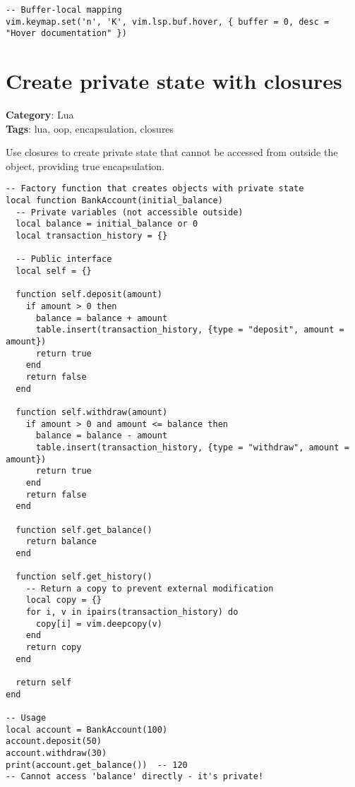 {{{{{{\begin{Exa*}{}
\begin{Verbatim}[fontsize=\footnotesize, breaklines, breakanywhere]
-- Buffer-local mapping
vim.keymap.set('n', 'K', vim.lsp.buf.hover, { buffer = 0, desc = "Hover documentation" })
\end{Verbatim}
\end{Exa*}

\section{Create private state with closures}

\textbf{Category}: Lua\\ \textbf{Tags}: lua, oop, encapsulation, closures
\vspace{0.5cm}

Use closures to create private state that cannot be accessed from outside the object, providing true encapsulation.

\begin{Exa*}{}
\begin{Verbatim}[fontsize=\footnotesize, breaklines, breakanywhere]
-- Factory function that creates objects with private state
local function BankAccount(initial_balance)
  -- Private variables (not accessible outside)
  local balance = initial_balance or 0
  local transaction_history = {}

  -- Public interface
  local self = {}

  function self.deposit(amount)
    if amount > 0 then
      balance = balance + amount
      table.insert(transaction_history, {type = "deposit", amount = amount})
      return true
    end
    return false
  end

  function self.withdraw(amount)
    if amount > 0 and amount <= balance then
      balance = balance - amount
      table.insert(transaction_history, {type = "withdraw", amount = amount})
      return true
    end
    return false
  end

  function self.get_balance()
    return balance
  end

  function self.get_history()
    -- Return a copy to prevent external modification
    local copy = {}
    for i, v in ipairs(transaction_history) do
      copy[i] = vim.deepcopy(v)
    end
    return copy
  end

  return self
end

-- Usage
local account = BankAccount(100)
account.deposit(50)
account.withdraw(30)
print(account.get_balance())  -- 120
-- Cannot access 'balance' directly - it's private!
\end{Verbatim}
\end{Exa*}

}}}}}}
